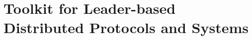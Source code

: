 %
%
%

\section{Toolkit for Leader-based Distributed Protocols and Systems}
\label{chapter:introduction:sec:toolkit-for-leader-based-distributed-protocols-and-systems}
%
%
%
%
%
